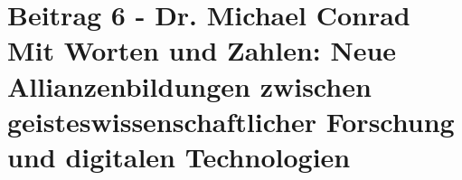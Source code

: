 \section*{Beitrag 6 - Dr. Michael Conrad
Mit Worten und Zahlen: Neue Allianzenbildungen zwischen geisteswissenschaftlicher Forschung und digitalen Technologien}

